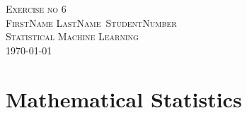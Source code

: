 \documentclass[12pt,a4paper]{article}
\def\StudentName{FirstName LastName}
\def\StudentMatricule{StudentNumber}
\def\ExerciseNo{6}
\numberwithin{exercise}{section} %
\numberwithin{solution}{section} %
\begin{document}
\begin{titlepage}
\begin{center}
\textsc{\LARGE Exercise no \ExerciseNo}\\[1.5cm]
\vspace{2in}
\textsc{\Large \StudentName~\StudentMatricule}\\[0.5cm]
\textsc{Statistical Machine Learning}\\[0.5cm]
\today
\end{center}
\end{titlepage}



\section{Mathematical Statistics}
\end{document}
